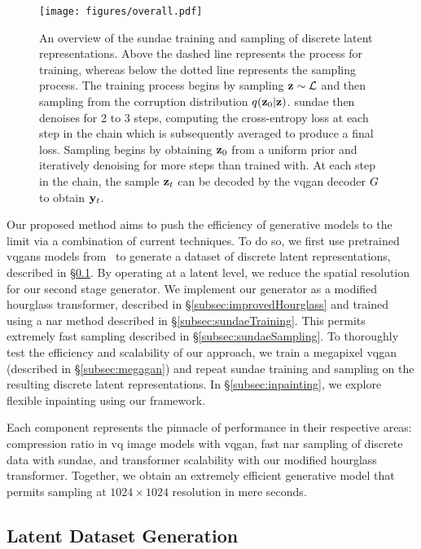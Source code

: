 \begin{figure}[ht]
    \centering
    \texttt{[image: figures/overall.pdf]}
    \caption{
        An overview of the \gls{sundae} training and sampling of discrete latent
        representations. Above the dashed line represents the process for
        training, whereas below the dotted line represents the sampling process.
        The training process begins by sampling $\mathbf{z} \sim \mathcal{L}$
        and then sampling from the corruption distribution $q(\mathbf{z}_0 \vert
        \mathbf{z})$. \Gls{sundae} then denoises for 2 to 3 steps, computing the
        cross-entropy loss at each step in the chain which is subsequently
        averaged to produce a final loss. Sampling begins by obtaining $\mathbf{z}_0$
        from a uniform prior and iteratively denoising for more steps than
        trained with. At each step in the chain, the sample $\mathbf{z}_t$ can be
        decoded by the \gls{vqgan} decoder $G$ to obtain $\mathbf{y}_t$.
    }
    \label{fig:overall}
\end{figure}


Our proposed method aims to push the efficiency of generative models to the
limit via a combination of current techniques. To do so, we first use pretrained
\glspl{vqgan} models from~\cite{esser2021taming} to generate a dataset of
discrete latent representations, described in \S\ref{subsec:datasetGen}. By
operating at a latent level, we reduce the spatial resolution for our second
stage generator. We implement our generator as a modified hourglass transformer,
described in \S\ref{subsec:improvedHourglass} and trained using a \gls{nar}
method described in \S\ref{subsec:sundaeTraining}. This permits extremely fast
sampling described in \S\ref{subsec:sundaeSampling}. To thoroughly test the
efficiency and scalability of our approach, we train a megapixel \gls{vqgan}
(described in \S\ref{subsec:megagan}) and repeat \gls{sundae} training and
sampling on the resulting discrete latent representations. In
\S\ref{subsec:inpainting}, we explore flexible inpainting using our framework.

Each component represents the pinnacle of performance in their respective areas:
compression ratio in \gls{vq} image models with \gls{vqgan}, fast \acrlong{nar}
sampling of discrete data with \gls{sundae}, and transformer scalability with
our modified hourglass transformer. Together, we obtain an extremely efficient
generative model that permits sampling at $1024 \times 1024$ resolution in mere
seconds.

\subsection{Latent Dataset Generation}
\label{subsec:datasetGen}

